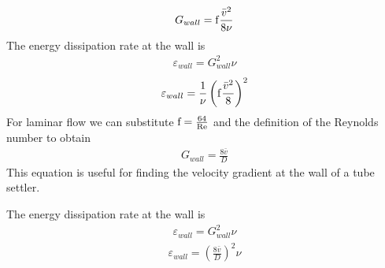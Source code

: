 \documentclass[letterpaper,10pt,english]{sphinxmanual}
\begin{document}
\begin{equation}\label{equation:Rapid_Mix/RM_Derivations:Rapid_Mix/RM_Derivations:108}
\begin{split}G_{wall} ={\rm f}  \frac{\bar v^2}{8\nu}\end{split}
\end{equation}
The energy dissipation rate at the wall is
\begin{equation}\label{equation:Rapid_Mix/RM_Derivations:Rapid_Mix/RM_Derivations:109}
\begin{split}\varepsilon_{wall} = G_{wall}^2 \nu\end{split}
\end{equation}\begin{equation}\label{equation:Rapid_Mix/RM_Derivations:Rapid_Mix/RM_Derivations:110}
\begin{split}\varepsilon_{wall} = \frac{1}{\nu}\left({\rm f}  \frac{\bar v^2}{8} \right)^2\end{split}
\end{equation}
For laminar flow we can substitute \({\rm f} = \frac{64}{{\rm Re}}\) and the definition of the Reynolds number to obtain
\begin{equation}\label{equation:Rapid_Mix/RM_Derivations:Rapid_Mix/RM_Derivations:111}
\begin{split}G_{wall} =  \frac{8\bar v}{D}\end{split}
\end{equation}
This equation is useful for finding the velocity gradient at the wall of a tube settler.

The energy dissipation rate at the wall is
\begin{equation}\label{equation:Rapid_Mix/RM_Derivations:Rapid_Mix/RM_Derivations:112}
\begin{split}\varepsilon_{wall} = G_{wall}^2 \nu\end{split}
\end{equation}\begin{equation}\label{equation:Rapid_Mix/RM_Derivations:Rapid_Mix/RM_Derivations:113}
\begin{split}\varepsilon_{wall} = \left(\frac{8\bar v}{D} \right)^2 \nu\end{split}
\end{equation}
\end{document}

